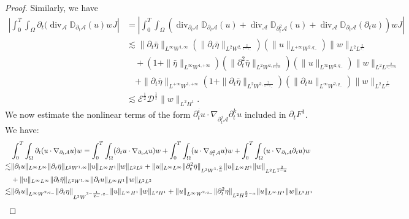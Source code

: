 \documentclass[10pt,a4paper]{amsart}
\def\p{\partial}
\begin{document}
\begin{proof}
			\noindent Similarly, we have
			\[
			\begin{aligned}
				\left|\int_{0}^{T}\int_{\Omega}\p_{t}(\operatorname{div}_{\mathcal{A}}\mathbb{D}_{\partial_{t}\mathcal{A}}(u)w J \right| & = \left| \int_{0}^{T}\int_{\Omega}(\operatorname{div}_{\p_{t}\mathcal{A}}\mathbb{D}_{\p_{t}\mathcal{A}}(u)+\operatorname{div}_{\mathcal{A}}\mathbb{D}_{\p_{t}^{2}\mathcal{A}}(u)+\operatorname{div}_{\mathcal{A}}\mathbb{D}_{\p_{t}\mathcal{A}}(\p_{t}u))w J\right|\\
				&\lesssim \|\p_{t}\bar{\eta}\|_{L^{\infty}W^{1,\infty}}(\|\p_{t}\bar{\eta}\|_{L^{2}W^{2,\frac{2}{1-\varepsilon_{-}}}})(\|u\|_{L^{+\infty}W^{2,q_{-}}})\|w\|_{L^{2}L^{\frac{2}{\varepsilon_{-}}}}\\
				&\quad+(1+\|\bar{\eta}\|_{L^{\infty}W^{1,+\infty}})(\|\p_{t}^{2}\bar{\eta}\|_{L^{2}W^{2,\frac{2}{1+\alpha}}})(\|u\|_{L^{\infty}W^{2,q_{-}}})\|w\|_{L^{2}L^{\frac{2}{\varepsilon_{-}-\alpha}}}\\
				&\quad+\|\p_{t}\bar{\eta}\|_{L^{+\infty}W^{1,+\infty}}(1+\|\p_{t}\bar{\eta}\|_{L^{2}W^{2,\frac{2}{1-\varepsilon_{-}}}})(\|\p_{t}u\|_{L^{\infty}W^{2,q_{-}}})\|w\|_{L^{2}L^{\frac{2}{\varepsilon_{-}}}}\\
				&\lesssim \mathscr{E}^{\frac{1}{2}}\mathscr{D}^{\frac{1}{2}}\|w\|_{L^{2}H^{1}}.
			\end{aligned}
			\]
			We now estimate the nonlinear terms of the form $\partial_{t}^{i}u\cdot \nabla_{\partial_{t}^{j}\mathcal{A}}\partial_{t}^{k}u$ included in $\p_{t}F^{1}$. We have:
			\[\begin{aligned}
				& \int_{0}^{T}\int_{\Omega}\p_{t}(u\cdot \nabla_{\p_{t}\mathcal{A}}u)w= \int_{0}^{T}\int_{\Omega}(\p_{t}u\cdot \nabla_{\p_{t}\mathcal{A}}u)w+\int_{0}^{T}\int_{\Omega}(u\cdot \nabla_{\p_{t}^{2}\mathcal{A}}u)w +\int_{0}^{T}\int_{\Omega}(u\cdot \nabla_{\p_{t}\mathcal{A}}\p_{t}u)w\notag\\
				\lesssim& \|\p_{t}u\|_{L^{\infty}L^{\infty}}\|\p_{t}\bar{\eta}\|_{L^{2}W^{1,\infty}}\|u\|_{L^{\infty}H^{1}}\|w\|_{L^{2}L^{2}}\notag +\|u\|_{L^{\infty}L^{\infty}}\|\p_{t}^{2}\bar{\eta}\|_{L^{2}W^{1,\frac{2}{\alpha}}}\|u\|_{L^{\infty}H^{1}}\|w\|_{L^{2}L^{\frac{2}{1-\alpha}}}\notag\\
				&+\|u\|_{L^{\infty}L^{\infty}}\|\p_{t}\bar{\eta}\|_{L^{2}W^{1,\infty}}\|\p_{t}u\|_{L^{\infty}H^{1}}\|w\|_{L^{2}L^{2}}\notag\\
				\lesssim&\|\p_{t}u\|_{L^{\infty}W^{2,q_{-}}}\|\p_{t}{\eta}\|_{L^{2}W^{3-\frac{1}{q_{-}},q_{-}}}\|u\|_{L^{\infty}H^{1}}\|w\|_{L^{2}H^{1}}+\|u\|_{L^{\infty}W^{2,q_{-}}}\|\p_{t}^{2}{\eta}\|_{L^{2}H^{\frac{3}{2}-\alpha}}\|u\|_{L^{\infty}H^{1}}\|w\|_{L^{2}H^{1}}\notag\\

\end{aligned}\]
\end{proof}
\end{document}
